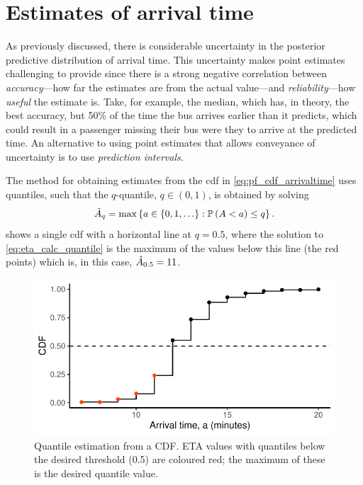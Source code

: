 \section{Estimates of arrival time}
\label{sec:eta_estimates}

As previously discussed, there is considerable uncertainty in the posterior predictive distribution of arrival time. This uncertainty makes point estimates challenging to provide since there is a strong negative correlation between \emph{accuracy}---how far the estimates are from the actual value---and \emph{reliability}---how \emph{useful} the estimate is. Take, for example, the median, which has, in theory, the best accuracy, but 50\% of the time the bus arrives earlier than it predicts, which could result in a passenger missing their bus were they to arrive at the predicted time. An alternative to using point estimates that allows conveyance of uncertainty is to use \emph{prediction intervals}.

The method for obtaining estimates from the \gls{cdf} in \cref{eq:pf_cdf_arrivaltime} uses quantiles, such that the $q$-quantile, $q\in(0,1)$, is obtained by solving
\begin{equation}
\label{eq:eta_calc_quantile}
\hat{A}_q = \max\left\{a \in \{0, 1, \ldots\} : \mathbb{P}\left(A < a\right) \leq q\right\}.
\end{equation}
 shows a single \gls{cdf} with a horizontal line at $q = 0.5$, where the solution to \cref{eq:eta_calc_quantile} is the maximum of the values below this line (the red points) which is, in this case, $\hat{A}_{0.5} = 11$.


\begin{knitrout}\small
{}\color{fgcolor}\begin{figure}

{\centering \includegraphics[width=.6\textwidth]{figure/eta_calc_quantile-1} 

}

\caption[Quantile estimation from a CDF]{Quantile estimation from a CDF. ETA values with quantiles below the desired threshold (0.5) are coloured red; the maximum of these is the desired quantile value.}\label{fig:eta_calc_quantile}
\end{figure}


\end{knitrout}




